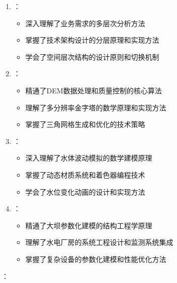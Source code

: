 \begin{enumerate}
\def\labelenumi{\arabic{enumi}.}
\tightlist
\item
  ：

  \begin{itemize}
  \tightlist
  \item
    深入理解了业务需求的多层次分析方法
  \item
    掌握了技术架构设计的分层原理和实现方法
  \item
    学会了空间层次结构的设计原则和切换机制
  \end{itemize}
\item
  ：

  \begin{itemize}
  \tightlist
  \item
    精通了DEM数据处理和质量控制的核心算法
  \item
    理解了多分辨率金字塔的数学原理和实现方法
  \item
    掌握了三角网格生成和优化的技术策略
  \end{itemize}
\item
  ：

  \begin{itemize}
  \tightlist
  \item
    深入理解了水体波动模拟的数学建模原理
  \item
    掌握了动态材质系统和着色器编程技术
  \item
    学会了水位变化动画的设计和实现方法
  \end{itemize}
\item
  ：

  \begin{itemize}
  \tightlist
  \item
    精通了大坝参数化建模的结构工程学原理
  \item
    理解了水电厂房的系统工程设计和监测系统集成
  \item
    掌握了复杂设备的参数化建模和性能优化方法
  \end{itemize}
\end{enumerate}

：

